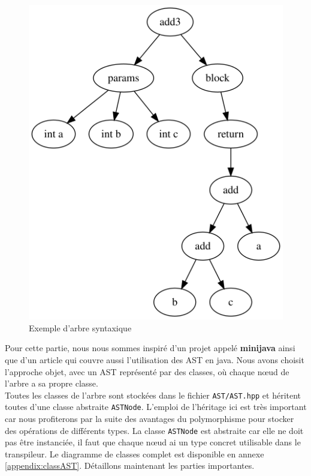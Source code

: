 \documentclass[a4paper]{article}%
\begin{document}
\begin{figure}[h]
  \begin{center}
  \includegraphics[scale=0.4]{img/ast1.png}
  \caption{Exemple d'arbre syntaxique}
  \end{center}
\end{figure}

Pour cette partie, nous nous sommes inspiré d'un projet appelé \textbf{minijava}
\cite{minijava} ainsi que d'un article \cite{gagnon1998sablecc} qui couvre aussi
l'utilisation des AST en java. Nous avons choisit l'approche objet, avec un AST
représenté par des classes, où chaque nœud de l'arbre a sa propre classe.\\

Toutes les classes de l'arbre sont stockées dans le fichier
\lstinline{AST/AST.hpp} et héritent toutes d'une classe abstraite
\lstinline{ASTNode}. L'emploi de l'héritage ici est très important car
nous profiterons par la suite des avantages du polymorphisme pour stocker des
opérations de différents types. La classe \lstinline{ASTNode} est abstraite car
elle ne doit pas être instanciée, il faut que chaque nœud ai un type concret
utilisable dans le transpileur. Le diagramme de classes complet est disponible
en annexe \ref{appendix:classAST}. Détaillons maintenant les parties
importantes.
\end{document}
